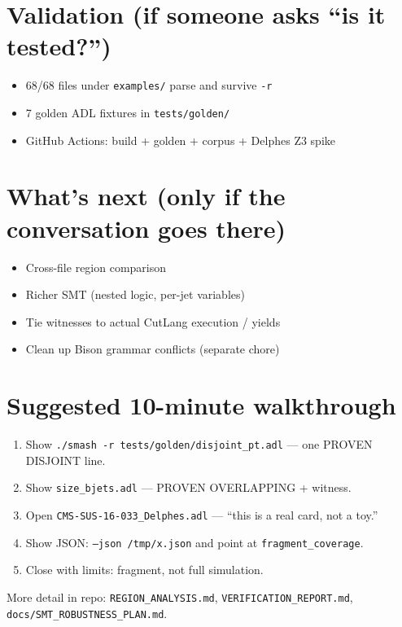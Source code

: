 \documentclass[11pt,a4paper]{article}
\begin{document}
\section{Validation (if someone asks ``is it tested?'')}

\begin{itemize}
  \item 68/68 files under \texttt{examples/} parse and survive \texttt{-r}
  \item 7 golden ADL fixtures in \texttt{tests/golden/}
  \item GitHub Actions: build + golden + corpus + Delphes Z3 spike
\end{itemize}

\section{What's next (only if the conversation goes there)}

\begin{itemize}
  \item Cross-file region comparison
  \item Richer SMT (nested logic, per-jet variables)
  \item Tie witnesses to actual CutLang execution / yields
  \item Clean up Bison grammar conflicts (separate chore)
\end{itemize}

\section{Suggested 10-minute walkthrough}

\begin{enumerate}
  \item Show \texttt{./smash -r tests/golden/disjoint\_pt.adl} --- one PROVEN DISJOINT line.
  \item Show \texttt{size\_bjets.adl} --- PROVEN OVERLAPPING + witness.
  \item Open \texttt{CMS-SUS-16-033\_Delphes.adl} --- ``this is a real card, not a toy.''
  \item Show JSON: \texttt{--json /tmp/x.json} and point at \texttt{fragment\_coverage}.
  \item Close with limits: fragment, not full simulation.
\end{enumerate}

\vfill
\noindent\hrulefill

\noindent\small More detail in repo: \texttt{REGION\_ANALYSIS.md},
\texttt{VERIFICATION\_REPORT.md}, \texttt{docs/SMT\_ROBUSTNESS\_PLAN.md}.
\end{document}
